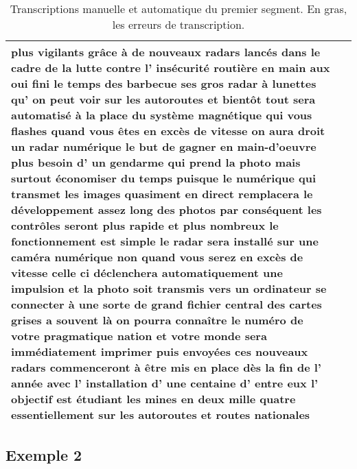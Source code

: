 \begin{table}[H]
\begin{center}
\begin{tabular}{|p{6.7cm}|p{6.6cm}|}
{plus vigilants grâce à de nouveaux radars lancés dans le cadre de la lutte
contre l' insécurité routière \textbf{en main aux oui} fini le temps des
barbecue \textbf{ses} gros \textbf{radar} à lunettes qu' on peut voir sur les
autoroutes \textbf{et} bientôt tout sera automatisé à la place du système
magnétique qui vous \textbf{flashes} quand vous êtes en excès de vitesse on aura
droit un radar numérique le but de gagner en main-d'oeuvre plus besoin d' un
gendarme qui prend la photo mais surtout économiser du temps puisque le
numérique qui transmet les images quasiment en direct remplacera le
développement assez long des photos par conséquent les contrôles seront plus
\textbf{rapide} et plus nombreux le fonctionnement est simple le radar sera
installé sur une caméra numérique \textbf{non} quand vous serez en excès de
vitesse celle ci déclenchera automatiquement une impulsion et la photo
\textbf{soit
transmis} vers un ordinateur \textbf{se connecter} à une sorte de grand fichier
central des cartes grises \textbf{a souvent} là on pourra connaître le numéro de
votre \textbf{pragmatique nation} et votre \textbf{monde} sera immédiatement
\textbf{imprimer} puis \textbf{envoyées} ces nouveaux radars commenceront à être
mis en place dès la fin de l' année avec l' installation d' une centaine d'
entre eux l' objectif est \textbf{étudiant les mines} en deux mille quatre
essentiellement sur les autoroutes et routes nationales
}\\
\hline
\end{tabular}
\caption{Transcriptions manuelle et automatique du premier segment. En gras,
les erreurs de transcription.}
\end{center}
\end{table}

\subsection*{Exemple 2}



